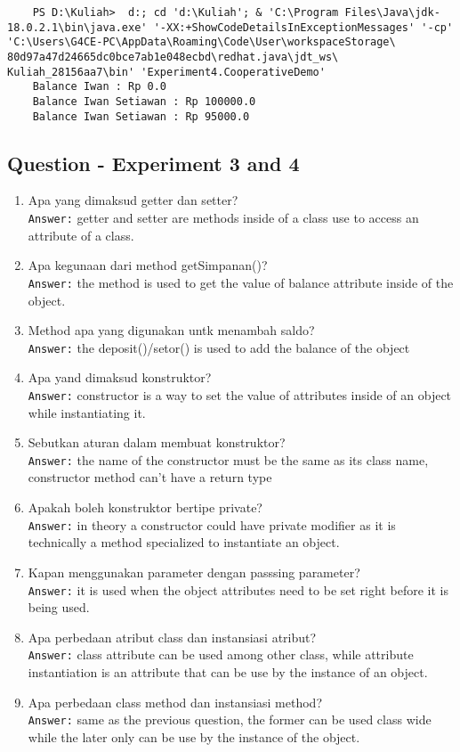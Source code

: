 \documentclass[12pt,titlepage]{article}
\begin{document}
\begin{verbatim}
    PS D:\Kuliah>  d:; cd 'd:\Kuliah'; & 'C:\Program Files\Java\jdk-18.0.2.1\bin\java.exe' '-XX:+ShowCodeDetailsInExceptionMessages' '-cp' 'C:\Users\G4CE-PC\AppData\Roaming\Code\User\workspaceStorage\ 80d97a47d24665dc0bce7ab1e048ecbd\redhat.java\jdt_ws\ Kuliah_28156aa7\bin' 'Experiment4.CooperativeDemo' 
    Balance Iwan : Rp 0.0
    Balance Iwan Setiawan : Rp 100000.0
    Balance Iwan Setiawan : Rp 95000.0
\end{verbatim}

\newpage

\subsection{Question - Experiment 3 and 4}

\begin{enumerate}
    \item Apa yang dimaksud getter dan setter? \\ 
    \texttt{Answer:} getter and setter are methods inside of a class use to access an attribute of a class.
    \item Apa kegunaan dari method getSimpanan()? \\ 
    \texttt{Answer:} the method is used to get the value of balance attribute inside of the object.
    \item Method apa yang digunakan untk menambah saldo? \\ 
    \texttt{Answer:} the deposit()/setor() is used to add the balance of the object
    \item Apa yand dimaksud konstruktor? \\ 
    \texttt{Answer:} constructor is a way to set the value of attributes inside of an object while instantiating it. 
    \item Sebutkan aturan dalam membuat konstruktor? \\ 
    \texttt{Answer:} the name of the constructor must be the same as its class name, constructor method can't have a return type
    \item Apakah boleh konstruktor bertipe private? \\ 
    \texttt{Answer:} in theory a constructor could have private modifier as it is technically a method specialized to instantiate an object.
    \item Kapan menggunakan parameter dengan passsing parameter? \\ 
    \texttt{Answer:} it is used when the object attributes need to be set right before it is being used.
    \item Apa perbedaan atribut class dan instansiasi atribut? \\ 
    \texttt{Answer:} class attribute can be used among other class, while attribute instantiation is an attribute that can be use by the instance of an object.
    \item Apa perbedaan class method dan instansiasi method?  \\ 
    \texttt{Answer:} same as the previous question, the former can be used class wide while the later only can be use by the instance of the object.
\end{enumerate}
\end{document}
